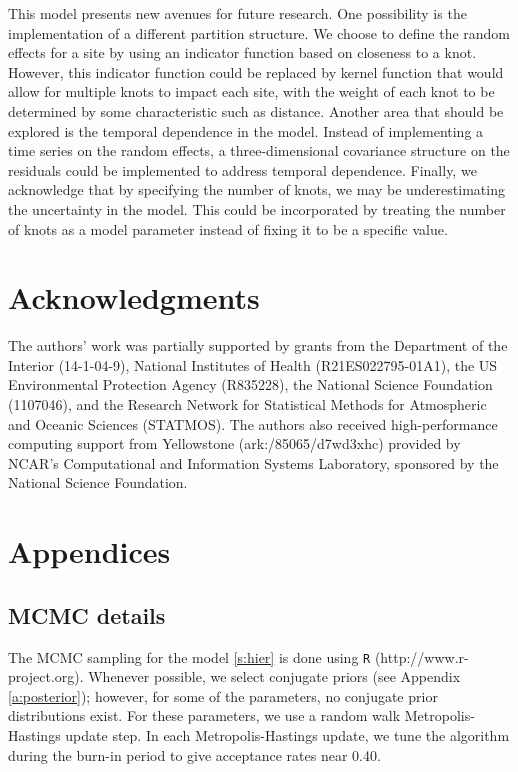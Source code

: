 \documentclass[11pt]{article}
\begin{document}
This model presents new avenues for future research.
One possibility is the implementation of a different partition structure.
We choose to define the random effects for a site by using an indicator function based on closeness to a knot.
However, this indicator function could be replaced by kernel function that would allow for multiple knots to impact each site, with the weight of each knot to be determined by some characteristic such as distance.
Another area that should be explored is the temporal dependence in the model.
Instead of implementing a time series on the random effects, a three-dimensional covariance structure on the residuals could be implemented to address temporal dependence.
Finally, we acknowledge that by specifying the number of knots, we may be underestimating the uncertainty in the model.
This could be incorporated by treating the number of knots as a model parameter instead of fixing it to be a specific value.

\section*{Acknowledgments}
The authors' work was partially supported by grants from the Department of the Interior (14-1-04-9), National Institutes of Health (R21ES022795-01A1), the US Environmental Protection Agency (R835228), the National Science Foundation (1107046), and the Research Network for Statistical Methods for Atmospheric and Oceanic Sciences (STATMOS).
The authors also received high-performance computing support from Yellowstone (ark:/85065/d7wd3xhc) provided by NCAR's Computational and Information Systems Laboratory, sponsored by the National Science Foundation.

\appendix
\section{Appendices}
\subsection{MCMC details} \label{a:mcmc}
The MCMC sampling for the model \ref{s:hier} is done using {\tt R} (http://www.r-project.org). Whenever possible, we select conjugate priors (see Appendix \ref{a:posterior}); however, for some of the parameters, no conjugate prior distributions exist.
For these parameters, we use a random walk Metropolis-Hastings update step.
In each Metropolis-Hastings update, we tune the algorithm during the burn-in period to give acceptance rates near 0.40.
\end{document}
